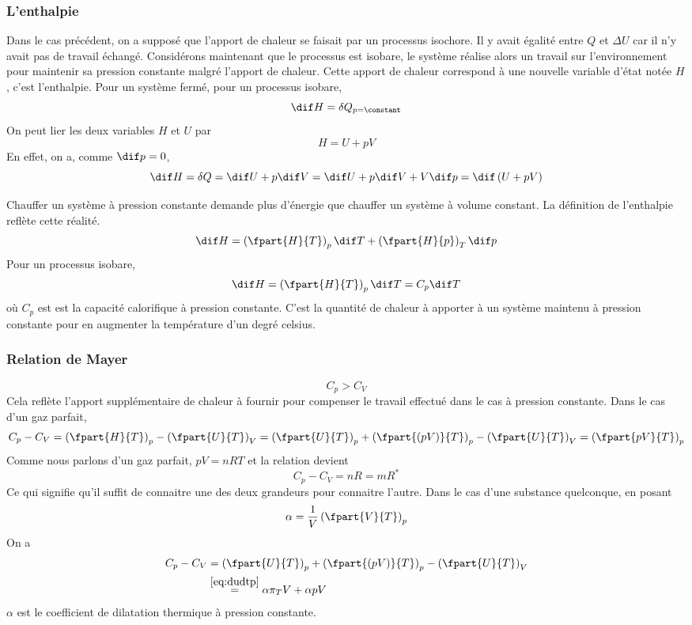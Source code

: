 \subsubsection{L'enthalpie}
Dans le cas précédent, on a supposé que
l'apport de chaleur se faisait par un processus isochore.
Il y avait égalité entre $Q$ et $\Delta U$
car il n'y avait pas de travail échangé.
Considérons maintenant que le processus est isobare,
le système réalise alors un travail sur l'environnement pour maintenir
sa pression constante malgré l'apport de chaleur.
Cette apport de chaleur correspond à une nouvelle variable d'état notée $H$,
c'est l'enthalpie.
Pour un système fermé, pour un processus isobare,
\[ \dif H = \delta Q_{p = \constant} \]
On peut lier les deux variables $H$ et $U$ par
\[ H = U + pV \]
En effet, on a, comme $\dif p = 0$,
\[
  \dif H
  = \delta Q
  = \dif U + p \dif V
  = \dif U + p \dif V + V\dif p
  = \dif \left(U + pV\right) %
\]

Chauffer un système à pression constante demande plus d'énergie
que chauffer un système à volume constant.
La définition de l'enthalpie reflète cette réalité.
\[ \dif H = \left(\fpart{H}{T}\right)_p \dif T +
\left(\fpart{H}{p}\right)_T \dif p \]
Pour un processus isobare,
\[ \dif H = \left(\fpart{H}{T}\right)_p \dif T = C_p\dif T \]
où $C_p$ est est la capacité calorifique à pression constante.
C'est la quantité de chaleur à apporter à un système maintenu à pression
constante pour en augmenter la température d'un degré celsius.


\subsubsection{Relation de Mayer}
\[ C_p > C_V \]
Cela reflète l'apport supplémentaire de chaleur à fournir pour
compenser le travail effectué dans le cas à pression constante.
Dans le cas d'un gaz parfait,
\[ C_p - C_V = \left(\fpart{H}{T}\right)_p -
\left(\fpart{U}{T}\right)_V =
\left(\fpart{U}{T}\right)_p +
\left(\fpart{(pV)}{T}\right)_p -
\left(\fpart{U}{T}\right)_V =
\left(\fpart{pV}{T}\right)_p \]
Comme nous parlons d'un gaz parfait,
$pV = nRT$ et la relation devient
\[ C_p - C_V = nR = mR^* \]
Ce qui signifie qu'il suffit de connaitre
une des deux grandeurs pour connaitre l'autre.
Dans le cas d'une substance quelconque, en posant
\[ \alpha = \frac{1}{V} \left(\fpart{V}{T}\right)_p \]
On a
\begin{align*}
  C_p - C_V & =
  \left(\fpart{U}{T}\right)_p +
  \left(\fpart{(pV)}{T}\right)_p -
  \left(\fpart{U}{T}\right)_V\\
  & \stackrel{\eqref{eq:dudtp}}{=} \alpha \pi_T V + \alpha p V
\end{align*}
$\alpha$ est le coefficient de dilatation thermique à pression constante.

